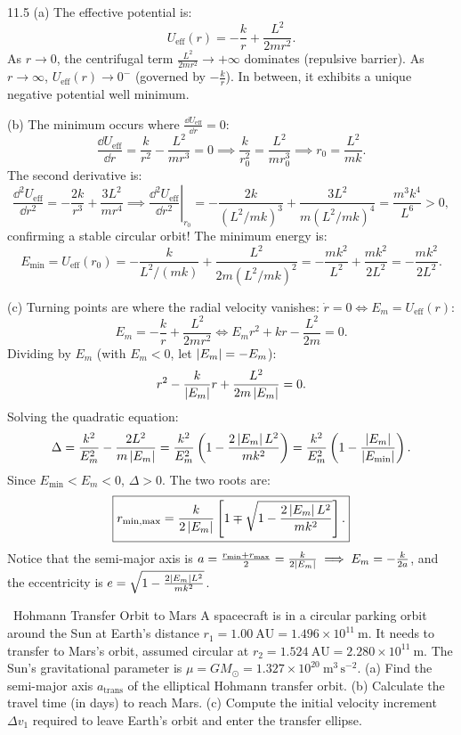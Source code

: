 \begin{solution}{11.5}
(a) The effective potential is:
\[
\boxed{U_{\text{eff}}(r) = -\frac{k}{r} + \frac{L^2}{2mr^2}.}
\]
As $r \to 0$, the centrifugal term $\frac{L^2}{2mr^2} \to +\infty$ dominates (repulsive barrier).
As $r \to \infty$, $U_{\text{eff}}(r) \to 0^-$ (governed by $-\frac{k}{r}$).
In between, it exhibits a unique negative potential well minimum.

(b) The minimum occurs where $\frac{\dd U_{\text{eff}}}{\dd r} = 0$:
\[
\frac{\dd U_{\text{eff}}}{\dd r} = \frac{k}{r^2} - \frac{L^2}{mr^3} = 0 \implies \frac{k}{r_0^2} = \frac{L^2}{mr_0^3} \implies \boxed{r_0 = \frac{L^2}{mk}.}
\]
The second derivative is:
\[
\frac{\dd^2 U_{\text{eff}}}{\dd r^2} = -\frac{2k}{r^3} + \frac{3L^2}{mr^4} \implies \left.\frac{\dd^2 U_{\text{eff}}}{\dd r^2}\right|_{r_0} = -\frac{2k}{(L^2/mk)^3} + \frac{3L^2}{m(L^2/mk)^4} = \frac{m^3 k^4}{L^6} > 0,
\]
confirming a stable circular orbit!
The minimum energy is:
\[
E_{\min} = U_{\text{eff}}(r_0) = -\frac{k}{L^2/(mk)} + \frac{L^2}{2m(L^2/mk)^2} = -\frac{mk^2}{L^2} + \frac{mk^2}{2L^2} = \boxed{-\frac{mk^2}{2L^2}.}
\]

(c) Turning points are where the radial velocity vanishes: $\dot{r} = 0 \iff E_m = U_{\text{eff}}(r)$:
\[
E_m = -\frac{k}{r} + \frac{L^2}{2mr^2} \iff E_m r^2 + kr - \frac{L^2}{2m} = 0.
\]
Dividing by $E_m$ (with $E_m < 0$, let $\left\lvert E_m \right\rvert = -E_m$):
\[
r^2 - \frac{k}{\left\lvert E_m \right\rvert}r + \frac{L^2}{2m\left\lvert E_m \right\rvert} = 0.
\]
Solving the quadratic equation:
\[
\Delta = \frac{k^2}{E_m^2} - \frac{2L^2}{m\left\lvert E_m \right\rvert} = \frac{k^2}{E_m^2}\left(1 - \frac{2\left\lvert E_m \right\rvert L^2}{mk^2}\right) = \frac{k^2}{E_m^2}\left(1 - \frac{\left\lvert E_m \right\rvert}{\left\lvert E_{\min} \right\rvert}\right).
\]
Since $E_{\min} < E_m < 0$, $\Delta > 0$. The two roots are:
\[
\boxed{r_{\min, \max} = \frac{k}{2\left\lvert E_m \right\rvert}\left[ 1 \mp \sqrt{1 - \frac{2\left\lvert E_m \right\rvert L^2}{mk^2}} \right].}
\]
Notice that the semi-major axis is $a = \frac{r_{\min} + r_{\max}}{2} = \frac{k}{2\left\lvert E_m \right\rvert} \implies E_m = -\frac{k}{2a}$, and the eccentricity is $e = \sqrt{1 - \frac{2\left\lvert E_m \right\rvert L^2}{mk^2}}$.
\end{solution}

\begin{exercise}{\core\ Hohmann Transfer Orbit to Mars}
A spacecraft is in a circular parking orbit around the Sun at Earth's distance $r_1 = 1.00\ \mathrm{AU} = 1.496\times 10^{11}\ \mathrm{m}$. It needs to transfer to Mars's orbit, assumed circular at $r_2 = 1.524\ \mathrm{AU} = 2.280\times 10^{11}\ \mathrm{m}$.
The Sun's gravitational parameter is $\mu = GM_\odot = 1.327\times 10^{20}\ \mathrm{m^3\,s^{-2}}$.
(a) Find the semi-major axis $a_{\text{trans}}$ of the elliptical Hohmann transfer orbit.
(b) Calculate the travel time (in days) to reach Mars.
(c) Compute the initial velocity increment $\Delta v_1$ required to leave Earth's orbit and enter the transfer ellipse.
\end{exercise}

